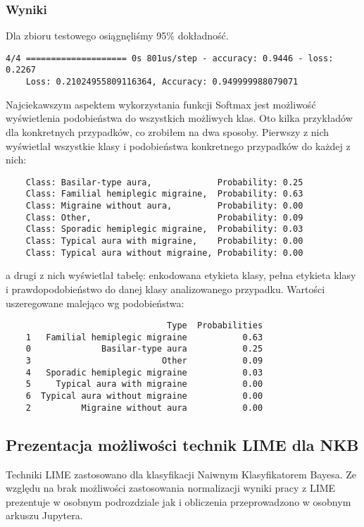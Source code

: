 \subsubsection{Wyniki}
Dla zbioru testowego osiągnęliśmy 95\% dokładność.\\

\begin{verbatim}
4/4 ==================== 0s 801us/step - accuracy: 0.9446 - loss: 0.2267
    Loss: 0.21024955809116364, Accuracy: 0.949999988079071
\end{verbatim}

Najciekawszym aspektem wykorzystania funkcji Softmax jest możliwość wyświetlenia podobieństwa do wszystkich możliwych klas. Oto kilka przykładów dla konkretnych przypadków, co zrobiłem na dwa sposoby. Pierwszy z nich wyświetlał wszystkie klasy i podobieństwa konkretnego przypadków do każdej z nich:\\

\begin{verbatim}
    Class: Basilar-type aura,             Probability: 0.25
    Class: Familial hemiplegic migraine,  Probability: 0.63
    Class: Migraine without aura,         Probability: 0.00
    Class: Other,                         Probability: 0.09
    Class: Sporadic hemiplegic migraine,  Probability: 0.03
    Class: Typical aura with migraine,    Probability: 0.00
    Class: Typical aura without migraine, Probability: 0.00
\end{verbatim}

a drugi z nich wyświetlał tabelę: enkodowana etykieta klasy, pełna etykieta klasy i prawdopodobieństwo do danej klasy analizowanego przypadku. Wartości uszeregowane malejąco wg podobieństwa:

\begin{verbatim}
                                Type  Probabilities
    1   Familial hemiplegic migraine           0.63
    0              Basilar-type aura           0.25
    3                          Other           0.09
    4   Sporadic hemiplegic migraine           0.03
    5     Typical aura with migraine           0.00
    6  Typical aura without migraine           0.00
    2          Migraine without aura           0.00
\end{verbatim}

\subsection{Prezentacja możliwości technik LIME dla NKB}
Techniki LIME zastosowano dla klasyfikacji Naiwnym Klasyfikatorem Bayesa. Ze względu na brak możliwości zastosowania normalizacji wyniki pracy z LIME prezentuje w osobnym podrozdziale jak i obliczenia przeprowadzono w osobnym arkuszu Jupytera.\\

